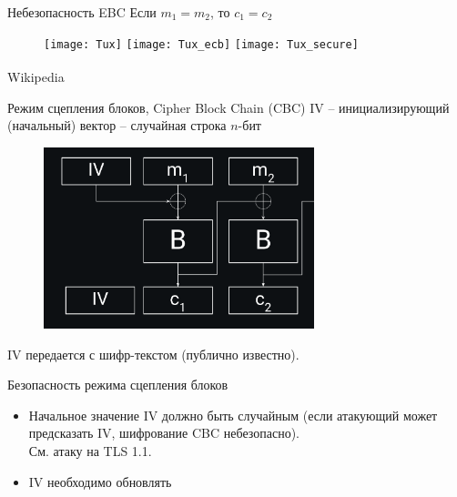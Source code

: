 \documentclass[usenames,dvipsnames,8pt,aspectratio=169]{beamer}
\begin{document}
\begin{frame}{Небезопасность EBC}
\centering
\Huge Если $m_1 = m_2$, то $c_1 = c_2$ \\[20pt]
\large
\begin{figure}
\texttt{[image: Tux]} \quad 
\texttt{[image: Tux\_ecb]} \quad 
\texttt{[image: Tux\_secure]}
\end{figure}

\vfill
\small
{\color{gray} \textsuperscript{\textcopyright} Wikipedia} 
\end{frame}

\begin{frame}{Режим сцепления блоков, Cipher Block Chain (CBC)}
\Large
{\color{Orange} IV} -- инициализирующий (начальный) вектор -- случайная строка $n$-бит

\begin{figure}
\includegraphics[width=0.7\textwidth]{CBC}
\end{figure}
IV передается с шифр-текстом (публично известно).
\end{frame}

\begin{frame}{Безопасность режима сцепления блоков}
\Large
\begin{itemize}
\itemsep 10pt
\item Начальное значение IV должно быть {\color{Orange} случайным} (если атакующий может предсказать IV, шифрование CBC небезопасно).\\ 
См. атаку на TLS 1.1.

\item{\color{Orange} IV необходимо обновлять}  \\

\end{itemize}
\end{frame}
\end{document}
